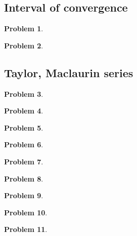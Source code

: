 \documentclass{article}
\newtheorem{problem}{Problem}
\begin{document}
\subsection{Interval of convergence}
\begin{problem}

\end{problem}
\begin{problem}

\end{problem}
\subsection{Taylor, Maclaurin series}
\begin{problem}

\end{problem}
\begin{problem}

\end{problem}
\begin{problem}

\end{problem}
\begin{problem}

\end{problem}

\begin{problem}

\end{problem}

\begin{problem}

\end{problem}


\begin{problem}

\end{problem}


\begin{problem}

\end{problem}
\begin{problem}

\end{problem}
\end{document}
